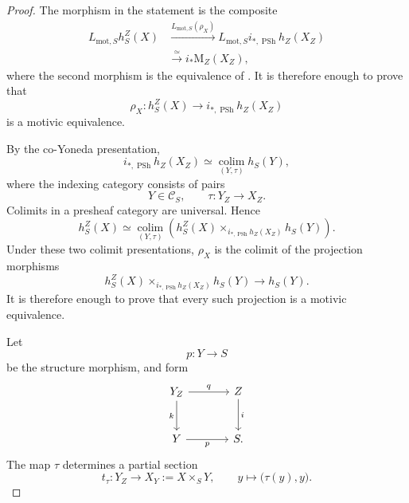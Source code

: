 \begin{proof}
The morphism in the statement is the composite
\[
\begin{aligned}
    L_{\mathrm{mot},S}h_S^Z(X)
    &\xrightarrow{
        L_{\mathrm{mot},S}(\rho_X)
    }
    L_{\mathrm{mot},S}
    i_{*,\operatorname{PSh}}h_Z(X_Z)
    \\
    &\xrightarrow{\simeq}
    i_*\mathrm M_Z(X_Z),
\end{aligned}
\]
where the second morphism is the equivalence of
.
It is therefore enough to prove that
\[
    \rho_X
    \colon
    h_S^Z(X)
    \longrightarrow
    i_{*,\operatorname{PSh}}h_Z(X_Z)
\]
is a motivic equivalence.

By the co-Yoneda presentation,
\[
    i_{*,\operatorname{PSh}}h_Z(X_Z)
    \simeq
    \operatorname*{colim}_{(Y,\tau)}
    h_S(Y),
\]
where the indexing category consists of pairs
\[
    Y
    \in
    \mathcal C_S,
    \qquad
    \tau
    \colon
    Y_Z
    \longrightarrow
    X_Z.
\]
Colimits in a presheaf category are universal.  Hence
\[
    h_S^Z(X)
    \simeq
    \operatorname*{colim}_{(Y,\tau)}
    \left(
        h_S^Z(X)
        \times_{
            i_{*,\operatorname{PSh}}h_Z(X_Z)
        }
        h_S(Y)
    \right).
\]
Under these two colimit presentations, \(\rho_X\) is the colimit of the
projection morphisms
\[
    h_S^Z(X)
    \times_{
        i_{*,\operatorname{PSh}}h_Z(X_Z)
    }
    h_S(Y)
    \longrightarrow
    h_S(Y).
\]
It is therefore enough to prove that every such projection is a
motivic equivalence.

Let
\[
    p
    \colon
    Y
    \longrightarrow
    S
\]
be the structure morphism, and form
\[
\begin{tikzcd}[column sep=large, row sep=large]
    Y_Z
        \arrow[r, "q"]
        \arrow[d, "k"']
    &
    Z
        \arrow[d, "i"]
    \\
    Y
        \arrow[r, "p"']
    &
    S.
\end{tikzcd}
\]
The map \(\tau\) determines a partial section
\[
    t_\tau
    \colon
    Y_Z
    \longrightarrow
    X_Y
    :=
    X\times_SY,
    \qquad
    y
    \longmapsto
    \bigl(
        \tau(y),y
    \bigr).
\]


\end{proof}
